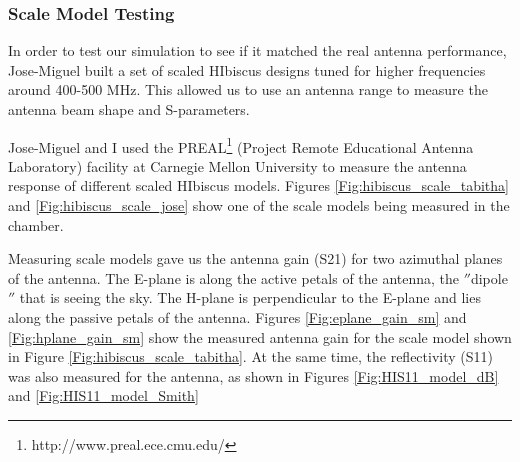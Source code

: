 \subsubsection{Scale Model Testing}
In order to test our simulation to see if it matched the real antenna performance, Jose-Miguel built a set of scaled HIbiscus designs tuned for higher frequencies around 400-500 MHz. This allowed us to use an antenna range to measure the antenna beam shape and S-parameters. 

Jose-Miguel and I used the PREAL\footnote{http://www.preal.ece.cmu.edu/} (Project Remote Educational Antenna Laboratory) facility at Carnegie Mellon University to measure the antenna response of different scaled HIbiscus models. Figures \ref{Fig:hibiscus_scale_tabitha} and \ref{Fig:hibiscus_scale_jose} show one of the scale models being measured in the chamber.

Measuring scale models gave us the antenna gain (S21) for two azimuthal planes of the antenna. The E-plane is along the active petals of the antenna, the $''$dipole$''$ that is seeing the sky. The H-plane is perpendicular to the E-plane and lies along the passive petals of the antenna. Figures \ref{Fig:eplane_gain_sm} and \ref{Fig:hplane_gain_sm} show the measured antenna gain for the scale model shown in Figure \ref{Fig:hibiscus_scale_tabitha}. At the same time, the reflectivity (S11) was also measured for the antenna, as shown in Figures \ref{Fig:HIS11_model_dB} and \ref{Fig:HIS11_model_Smith}

